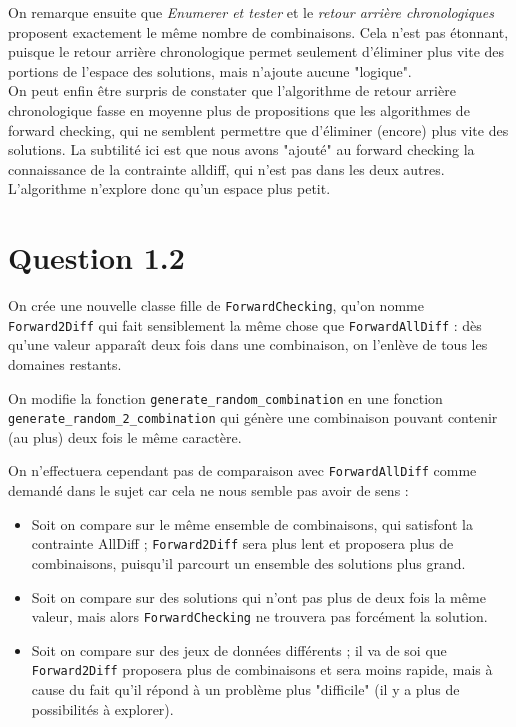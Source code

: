 \documentclass[a4paper, 12pt]{report}
\newcommand{\py}[1]{\texttt{#1}}
\begin{document}
On remarque ensuite que \textit{Enumerer et tester} et le \textit{retour arrière chronologiques} proposent exactement le même nombre de combinaisons. Cela n'est pas étonnant, puisque le retour arrière chronologique permet seulement d'éliminer plus vite des portions de l'espace des solutions, mais n'ajoute aucune "logique". \\

On peut enfin être surpris de constater que l'algorithme de retour arrière chronologique fasse en moyenne plus de propositions que les algorithmes de forward checking, qui ne semblent permettre que d'éliminer (encore) plus vite des solutions. La subtilité ici est que nous avons "ajouté" au forward checking la connaissance de la contrainte alldiff, qui n'est pas dans les deux autres. L'algorithme n'explore donc qu'un espace plus petit.

\section*{Question 1.2}

On crée une nouvelle classe fille de \py{ForwardChecking}, qu'on nomme \py{Forward2Diff} qui fait sensiblement la même chose que \py{ForwardAllDiff} : dès qu'une valeur apparaît deux fois dans une combinaison, on l'enlève de tous les domaines restants.

On modifie la fonction \py{generate_random_combination} en une fonction \py{generate_random_2_combination} qui génère une combinaison pouvant contenir (au plus) deux fois le même caractère.

On n'effectuera cependant pas de comparaison avec \py{ForwardAllDiff} comme demandé dans le sujet car cela ne nous semble pas avoir de sens :

\begin{itemize}
	\item Soit on compare sur le même ensemble de combinaisons, qui satisfont la contrainte AllDiff ; \py{Forward2Diff} sera plus lent et proposera plus de combinaisons, puisqu'il parcourt un ensemble des solutions plus grand.
	
	\item Soit on compare sur des solutions qui n'ont pas plus de deux fois la même valeur, mais alors \py{ForwardChecking} ne trouvera pas forcément la solution.
	
	\item Soit on compare sur des jeux de données différents ; il va de soi que \py{Forward2Diff} proposera plus de combinaisons et sera moins rapide, mais à cause du fait qu'il répond à un problème plus "difficile" (il y a plus de possibilités à explorer).
\end{itemize}
\end{document}
